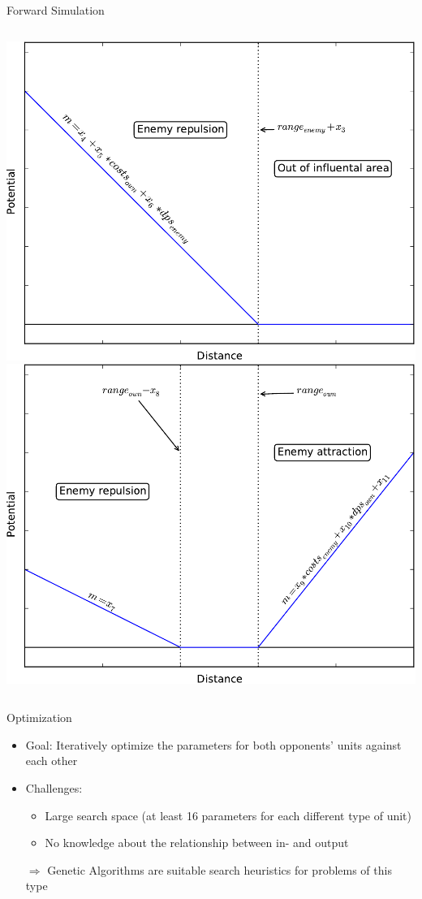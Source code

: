 \documentclass{beamer}
\begin{document}
\begin{frame}{Forward Simulation}
\begin{columns}[c] %
  \includegraphics[width=1.0\linewidth]{enemy1-crop.pdf}
  \includegraphics[width=1.0\linewidth]{enemy2-crop.pdf}
\end{columns}
\end{frame}

\begin{frame}{Optimization}
\begin{itemize}
\item \alert{Goal:} Iteratively optimize the parameters for both opponents' units against each other
\item \alert{Challenges:} 
\begin{itemize}
\item Large search space (at least 16 parameters for each different type of unit) 
\item No knowledge about the relationship between in- and output
\end{itemize}
$\Rightarrow$ \alert{Genetic Algorithms} are suitable search heuristics for problems of this type
\end{itemize}
\end{frame}
\end{document}
